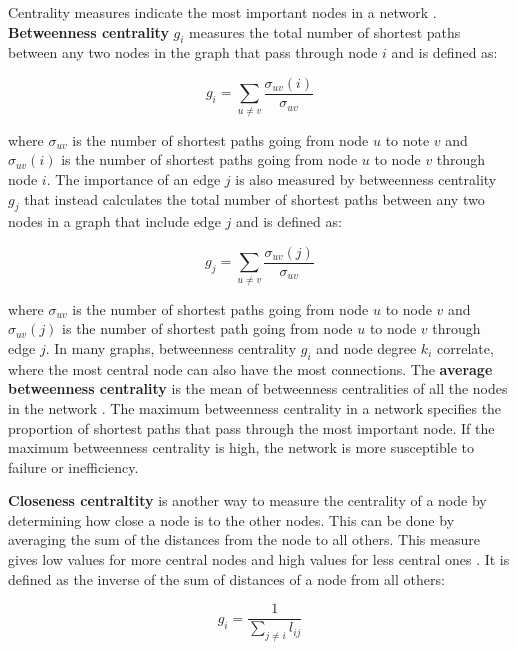 {{Centrality measures indicate the most important nodes in a network \cite{huang_2016, zhong_2017}. \textbf{Betweenness centrality} $g_i$ measures the total number of shortest paths between any two nodes in the graph that pass through node $i$ \cite{freeman_1997, ermagun-levinson_2017} and is defined as:

\begin{equation} \label{eq:6}
g_i = \sum_{u \neq v} \frac{\sigma_{uv} (i)}{\sigma_{uv}}
\end{equation}

where $\sigma_{uv}$ is the number of shortest paths going from node $u$ to note $v$ and $\sigma_{uv}(i)$ is the number of shortest paths going from node $u$ to node $v$ through node $i$. The importance of an edge $j$ is also measured by betweenness centrality $g_j$ that instead calculates the total number of shortest paths between any two nodes in a graph that include edge $j$ \cite{newman_2003} and is defined as:

\begin{equation} \label{eq:7}
g_j = \sum_{u \neq v} \frac{\sigma_{uv} (j)}{\sigma_{uv}}
\end{equation}

where $\sigma_{uv}$ is the number of shortest paths going from node $u$ to node $v$ and $\sigma_{uv}(j)$ is the number of shortest path going from node $u$ to node $v$ through edge $j$. In many graphs, betweenness centrality $g_i$ and node degree $k_i$ correlate, where the most central node can also have the most connections. The \textbf{average betweenness centrality} is the mean of betweenness centralities of all the nodes in the network \cite{barthelemy_spatial_2011}. The maximum betweenness centrality in a network specifies the proportion of shortest paths that pass through the most important node. If the maximum betweenness centrality is high, the network is more susceptible to failure or inefficiency.

\textbf{Closeness centraltity} is another way to measure the centrality of a node by determining how close a node is to the other nodes. This can be done by averaging the sum of the distances from the node to all others. This measure gives low values for more central nodes and high values for less central ones \cite{newman_2010}. It is defined as the inverse of the sum of distances of a node from all others:

\begin{equation} \label{eq:8}
g_i = \frac{1}{\sum_{j \neq i} l_{ij}}
\end{equation}

}}
